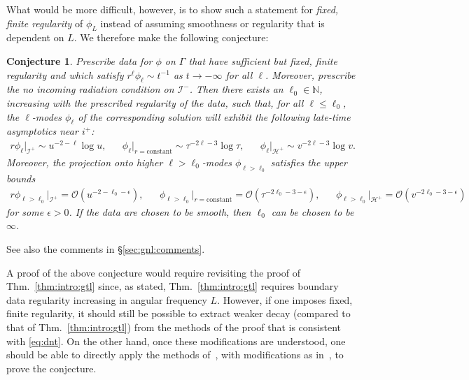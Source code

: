 \documentclass[11pt,english]{article}
\numberwithin{equation}{section}
\newtheorem{conj}{Conjecture}
\theoremstyle{remark}
\theoremstyle{plain}
\theoremstyle{remark}
\renewcommand{\(}{\left(}
\renewcommand{\)}{\right)}
\begin{document}
What would be more difficult, however, is to show such a statement for \textit{fixed, finite regularity} of $\phi_L$ instead of assuming smoothness or regularity that is dependent on $L$. We therefore make the following conjecture:
\begin{conj}\label{conj1}
Prescribe data for $\phi$ on $\Gamma$ that have sufficient but fixed, finite regularity and which satisfy $r^\ell\phi_\ell\sim t^{-1}$ as $t\to-\infty$ for all $\ell$. 
Moreover, prescribe the no incoming radiation condition on $\mathcal I^-$. 
Then there exists an $\ell_0\in \mathbb N$, increasing with the prescribed regularity of the data, such that, for all $\ell\leq \ell_0$, the $\ell$-modes $\phi_\ell$ of the corresponding solution will exhibit the following late-time asymptotics near $i^+$:
\begin{align}\label{eq:dnnt}
r\phi_\ell|_{\mathcal I^+}\sim u^{-2-\ell}\log u, &&\phi_\ell|_{r=\text{constant}}\sim \tau^{-2\ell-3}\log \tau, &&\phi_\ell|_{\mathcal H^+}\sim v^{-2\ell-3}\log v.
\end{align} 
Moreover, the projection onto higher $\ell>\ell_0$-modes $\phi_{\ell>\ell_0}$ satisfies the upper bounds
\begin{align}\label{eq:dnt}
r\phi_{\ell>\ell_0}|_{\mathcal I^+}=\mathcal O( u^{-2-\ell_0-\epsilon}), &&\phi_{\ell>\ell_0}|_{r=\text{constant}}=\mathcal O( \tau^{-2\ell_0-3-\epsilon}), &&\phi_{\ell>\ell_0}|_{\mathcal H^+}=\mathcal O( v^{-2\ell_0-3-\epsilon})
\end{align} 
for some $\epsilon>0$.
 If the data are chosen to be smooth, then $\ell_0$ can be chosen to be $\infty$.
\end{conj}
See also the comments in \S\ref{sec:gnl:comments}.

A proof of the above conjecture would require revisiting the proof of Thm.\ \ref{thm:intro:gtl} since, as stated, Thm.\ \ref{thm:intro:gtl} requires boundary data regularity increasing in angular frequency $L$. However, if one imposes fixed, finite regularity, it should still be possible to extract weaker decay (compared to that of Thm.\ \ref{thm:intro:gtl}) from the methods of the proof that is consistent with \eqref{eq:dnt}.
On the other hand, once these modifications are understood, one should be able to directly apply the methods of~\cite{AAG21}, with modifications as in~\cite{II}, to prove the conjecture.
\end{document}

